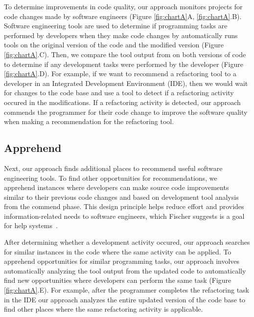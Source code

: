 \documentclass[sigconf,review,anonymous]{acmart}
\newcommand{\tool}{\textsl{tool-recommender-bot}}
\begin{document}
To determine improvements in code quality, our approach monitors projects for code changes made by software engineers (Figure \ref{fig:chartA}A, \ref{fig:chartA}.B). Software engineering tools are used to determine if programming tasks are performed by developers when they make code changes by automatically runs tools on the original version of the code and the modified version (Figure \ref{fig:chartA}.C). Then, we compare the tool output from on both versions of code to determine if any development tasks were performed by the developer (Figure \ref{fig:chartA}.D). For example, if we want to recommend a refactoring tool to a developer in an Integrated Development Environment (IDE), then we would wait for changes to the code base and use a tool to detect if a refactoring activity occured in the modifications. If a refactoring activity is detected, our approach commends the programmer for their code change to improve the software quality when making a recommendation for the refactoring tool.


\subsection{Apprehend}

Next, our approach finds additional places to recommend useful software engineering tools. To find other opportunities for recommendations, we apprehend instances where developers can make source code improvements similar to their previous code changes and based on development tool analysis from the commend phase. This design principle helps reduce effort and provides information-related needs to software engineers, which Fischer suggests is a goal for help systems~\cite{Fischer1984ActiveHelpSystems}. 

After determining whether a development activity occured, our approach searches for similar instances in the code where the same activity can be applied. To apprehend opportunities for similar programming tasks, our approach involves automatically analyzing the tool output from the updated code to automatically find new opportunities where developers can perform the same task  (Figure \ref{fig:chartA}.E). For example, after the programmer completes the refactoring task in the IDE our approach analyzes the entire updated version of the code base to find other places where the same refactoring activity is applicable. 
\end{document}
